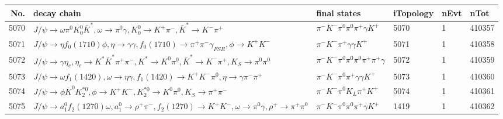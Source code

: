 \begin{table}[htbp] 
\begin{center}
\begin{small}
\begin{tabular}{rlllll}\hline\hline
 No. & decay chain & final states &  iTopology & nEvt & nTot \\\hline
5070&$J/\psi       \rightarrow \omega         \pi^{0}        K_0^{0}        \bar{K}^{*}   , \omega          \rightarrow \pi^{0}        \gamma       , K_0^{0}         \rightarrow K^{+}          \pi^{-}        , \bar{K}^{*}    \rightarrow K^{-}          \pi^{+}        $&$\pi^{-}        K^{-}          \pi^{0}        \pi^{0}        \pi^{+}        \gamma       K^{+}          $& 5070&    1&410357\\
5071&$J/\psi       \rightarrow \eta          f_{0}(1710)    \phi           , \eta           \rightarrow \gamma       \gamma       , f_{0}(1710)     \rightarrow \pi^{+}        \pi^{-}        \gamma_{FSR} , \phi            \rightarrow K^{+}          K^{-}          $&$\pi^{-}        K^{-}          \pi^{+}        \gamma       \gamma       K^{+}          $& 5071&    1&410358\\
5072&$J/\psi       \rightarrow \gamma       \eta_{c}    , \eta_{c}     \rightarrow K^{*}          \bar{K}^{*}   \pi^{+}        \pi^{-}        , K^{*}           \rightarrow K^{0}          \pi^{0}        , \bar{K}^{*}    \rightarrow K^{-}          \pi^{+}        , K_{S}           \rightarrow \pi^{0}        \pi^{0}        $&$\pi^{-}        K^{-}          \pi^{0}        \pi^{0}        \pi^{0}        \pi^{+}        \pi^{+}        \gamma       $& 5072&    1&410359\\
5073&$J/\psi       \rightarrow \omega         f_{1}(1420)    , \omega          \rightarrow \eta          \gamma       , f_{1}(1420)     \rightarrow K^{+}          K^{-}          \pi^{0}        , \eta           \rightarrow \gamma       \pi^{-}        \pi^{+}        $&$\pi^{-}        K^{-}          \pi^{0}        \pi^{+}        \gamma       \gamma       K^{+}          $& 5073&    1&410360\\
5074&$J/\psi       \rightarrow \phi           \bar{K}^{0}   K_2^{*0}       , \phi            \rightarrow K^{+}          K^{-}          , K_2^{*0}        \rightarrow K^{0}          \pi^{0}        , K_{S}           \rightarrow \pi^{+}        \pi^{-}        $&$\pi^{-}        K^{-}          \pi^{0}        K_{L}          \pi^{+}        K^{+}          $& 5074&    1&410361\\
5075&$J/\psi       \rightarrow a_{1}^{0}      f_{2}(1270)    \omega         , a_{1}^{0}       \rightarrow \rho^{+}      \pi^{-}        , f_{2}(1270)     \rightarrow K^{+}          K^{-}          , \omega          \rightarrow \pi^{0}        \gamma       , \rho^{+}       \rightarrow \pi^{+}        \pi^{0}        $&$\pi^{-}        K^{-}          \pi^{0}        \pi^{0}        \pi^{+}        \gamma       K^{+}          $& 1419&    1&410362\\

\end{tabular}
\end{small}
\end{center}
\end{table}
